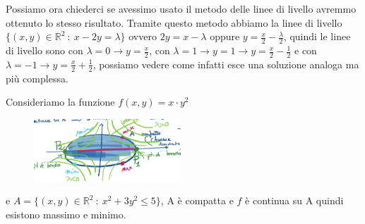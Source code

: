 Possiamo ora chiederci se avessimo usato il metodo delle linee di livello avremmo ottenuto lo stesso risultato. Tramite questo metodo abbiamo la linee di livello $\{(x,y) \in \mathbb{R}^2 \::\: x - 2y = \lambda\}$ ovvero $2y = x - \lambda$ oppure $y = \frac{x}{2} - \frac{\lambda}{2}$, quindi le linee di livello sono con $\lambda = 0 \to y = \frac{x}{2}$, con $\lambda = 1 \to y = 1 \to y = \frac{x}{2} - \frac{1}{2}$ e con $\lambda = -1 \to y = \frac{x}{2} + \frac{1}{2}$, possiamo vedere come infatti esce una soluzione analoga ma più complessa. \\

\begin{example}
Consideriamo la funzione $f(x,y) = x \cdot y^2$
\end{example}

\begin{figure}
    \vspace{-30pt}
    \centering
    \includegraphics[width=5.5cm]{images/ess-moltip-lagrange-2.png}
\end{figure}
\hspace{-15pt}e $A = \{(x,y) \in \mathbb{R}^2 \::\: x^2 + 3y^2 \leq 5\}$, 
A è compatta e $f$ è continua su A quindi esistono massimo e minimo.\\

